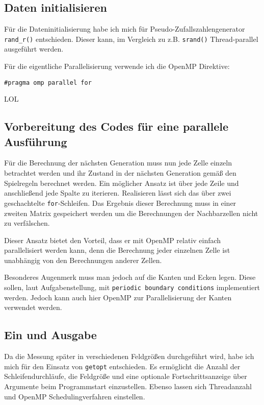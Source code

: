 \documentclass[german,plainarticle,hyperref,utf8]{zihpub}
\begin{document}
	\subsection{Daten initialisieren}
	Für die Dateninitialisierung habe ich mich für Pseudo-Zufallszahlengenerator \texttt{rand\_r()} entschieden. Dieser kann, im Vergleich zu z.B. \texttt{srand()} Thread-parallel ausgeführt werden.
	
	Für die eigentliche Parallelisierung verwende ich die OpenMP Direktive:
	
	\texttt{\#pragma omp parallel for}
	
	LOL
	
	
	
	
	\cite{moore}
		
	\subsection{Vorbereitung des Codes für eine parallele Ausführung}
	Für die Berechnung der nächsten Generation muss nun jede Zelle einzeln betrachtet werden und ihr Zustand in der nächsten Generation gemäß den Spielregeln berechnet werden.
	Ein möglicher Ansatz ist über jede Zeile und anschließend jede Spalte zu iterieren. Realisieren lässt sich das über zwei geschachtelte \verb|for|-Schleifen. Das Ergebnis dieser Berechnung muss in einer zweiten Matrix gespeichert werden um die Berechnungen der Nachbarzellen nicht zu verfälschen.
	
	Dieser Ansatz bietet den Vorteil, dass er mit OpenMP relativ einfach parallelisiert werden kann, denn die Berechnung jeder einzelnen Zelle ist unabhängig von den Berechnungen anderer Zellen.
	
	Besonderes Augenmerk muss man jedoch auf die Kanten und Ecken legen. Diese sollen, laut Aufgabenstellung, mit \verb|periodic boundary conditions| implementiert werden. Jedoch kann auch hier OpenMP zur Parallelisierung der Kanten verwendet werden.

	\subsection{Ein und Ausgabe}
	Da die Messung später in verschiedenen Feldgrößen durchgeführt wird, habe ich mich für den Einsatz von \verb|getopt| entschieden. Es ermöglicht die Anzahl der Schleifendurchläufe, die Feldgröße und eine optionale Fortschrittsanzeige über Argumente beim Programmstart einzustellen.
	Ebenso lassen sich Threadanzahl und OpenMP Schedulingverfahren einstellen.
	
	

\end{document}
